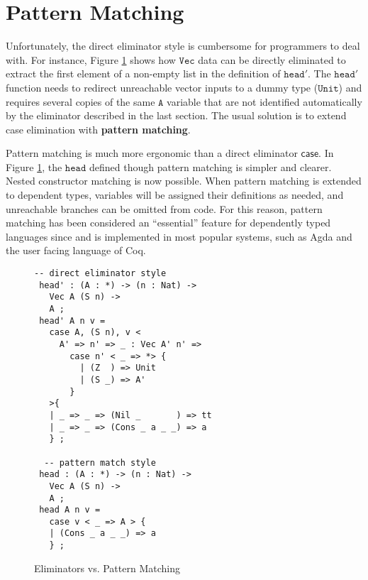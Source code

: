 
\section{Pattern Matching}

Unfortunately, the direct eliminator style is cumbersome for programmers to deal with.
For instance, Figure \ref{fig:data-eliminators} shows how $\mathtt{Vec}$ data can be directly eliminated to extract the first element of a non-empty list in the definition of $\mathtt{head'}$.
The $\mathtt{head'}$ function needs to redirect unreachable vector inputs to a dummy type ($\mathtt{Unit}$) and requires several copies of the same $\mathtt{A}$ variable that are not identified automatically by the eliminator described in the last section.
The usual solution is to extend case elimination with \textbf{pattern matching}.

Pattern matching is much more ergonomic than a direct eliminator $\mathsf{case}$.
In Figure \ref{fig:data-eliminators}, the $\mathtt{head}$ defined though pattern matching is simpler and clearer.
Nested constructor matching is now possible.
When pattern matching is extended to dependent types, variables will be assigned their definitions as needed, and unreachable branches can be omitted from code.
For this reason, pattern matching has been considered an ``essential'' feature for dependently typed languages since \cite{coquand1992pattern} and is implemented in most popular systems, such as Agda and the user facing language of Coq.


\begin{figure}
\begin{lstlisting}[basicstyle={\ttfamily\small}]
 -- direct eliminator style
 head' : (A : *) -> (n : Nat) ->
   Vec A (S n) ->
   A ;
 head' A n v =
   case A, (S n), v <
     A' => n' => _ : Vec A' n' =>
       case n' < _ => *> {
         | (Z  ) => Unit
         | (S _) => A'
       }
   >{
   | _ => _ => (Nil _       ) => tt
   | _ => _ => (Cons _ a _ _) => a
   } ;

  -- pattern match style
 head : (A : *) -> (n : Nat) ->
   Vec A (S n) ->
   A ;
 head A n v =
   case v < _ => A > {
   | (Cons _ a _ _) => a
   } ;
\end{lstlisting}




\caption{Eliminators vs. Pattern Matching}
\label{fig:data-eliminators}
\end{figure}

